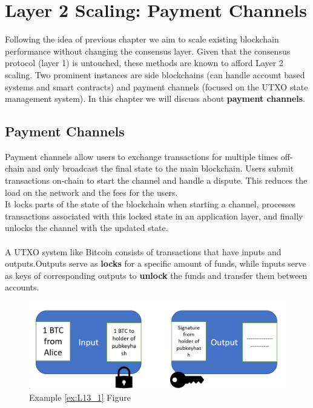 \chapter{Layer 2 Scaling: Payment Channels}
Following the idea of previous chapter we aim to scale existing blockchain performance without changing the consensus layer. Given that the consensus protocol (layer 1) is untouched, these methods are known to afford Layer 2 scaling. Two prominent
instances are side blockchains (can handle account based systems and smart contracts) and payment channels (focused on the UTXO state management system). In this chapter we will discuss about \textbf{payment channels}.

\section{Payment Channels}
Payment channels allow users to exchange transactions for multiple times off-chain and only broadcast the final state to the main blockchain. Users submit transactions on-chain to start the channel and handle a dispute. This reduces the load on the network and the fees for the users. \\
It locks parts of the state of the blockchain when starting a channel, processes transactions associated with this locked state in an application layer, and finally unlocks the channel with the updated state.\\\\
A UTXO system like Bitcoin consists of transactions that have inputs and outputs.Outputs serve as \textbf{locks} for a specific amount of funds, while inputs serve as keys of corresponding outputs to \textbf{unlock} the funds and transfer them between accounts.

\begin{figure}[h!]
	\centering
	\includegraphics[width=0.7\linewidth]{Fig/L13_F1}
	\caption{Example \ref{ex:L13_1} Figure}
	\label{fig:L13_f1}
\end{figure}

